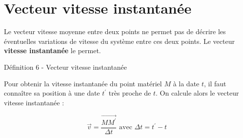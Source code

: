 \documentclass[french, a4paper, 12pt, twocolumn, landscape]{article}
\begin{document}
\section{Vecteur vitesse instantanée}

Le vecteur vitesse moyenne entre deux points ne permet pas de décrire les éventuelles variations de vitesse du système entre ces deux points. Le vecteur \textbf{vitesse instantanée} le permet.

\begin{definition}{Définition 6 - Vecteur vitesse instantanée}

		Pour obtenir la vitesse instantanée du point matériel $M$ à la date $t$, il faut connaître sa position à une date $t^\prime$ très proche de $t$. On calcule alors le vecteur vitesse instantanée : 
	
		$$\vec{v} = \dfrac{\vec{MM^\prime}}{\Delta t}\text{  avec } \Delta t = t^\prime - t$$

\end{definition}

	
\end{document}
